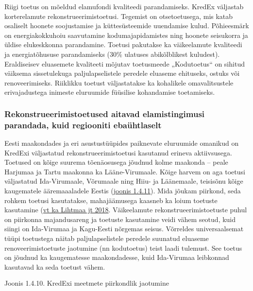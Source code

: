 \documentclass[estonian,]{article}
\begin{document}
Riigi toetus on mõeldud elamufondi kvaliteedi parandamiseks. KredEx väljastab korterelamute rekonstrueerimistoetusi. Tegemist on otsetoetusega, mis katab osaliselt hoonete soojustamise ja küttesüsteemide uuendamise kulud. Põhieesmärk on energiakokkuhoiu saavutamine kodumajapidamistes ning hoonete seisukorra ja üldise elukeskkonna parandamine. Toetusi pakutakse ka väikeelamute kvaliteedi ja energiatõhususe parandamiseks (30\% ulatuses abikõlblikest kuludest). Eraldiseisev eluasemete kvaliteeti mõjutav toetusmeede „Kodutoetus`` on sihitud väiksema sissetulekuga paljulapselistele peredele eluaseme ehituseks, ostuks või renoveerimiseks. Riiklikku toetust väljastatakse ka kohalikele omavalitsustele erivajadustega inimeste eluruumide füüsilise kohandamise toetamiseks.

\hypertarget{rekonstrueerimistoetused-aitavad-elamistingimusi-parandada-kuid-regiooniti-ebauxfchtlaselt}{%
\subsubsection*{Rekonstrueerimistoetused aitavad elamistingimusi parandada, kuid regiooniti ebaühtlaselt}\label{rekonstrueerimistoetused-aitavad-elamistingimusi-parandada-kuid-regiooniti-ebauxfchtlaselt}}

Eesti maakondades ja eri asustustüüpides paiknevate eluruumide omanikud on KredExi väljastatud rekonstrueerimistoetusi kasutanud erineva aktiivsusega. Toetused on kõige suurema tõenäosusega jõudnud kolme maakonda -- peale Harjumaa ja Tartu maakonna ka Lääne-Virumaale. Kõige harvem on aga toetusi väljastatud Ida-Virumaale, Võrumaale ning Hiiu- ja Läänemaale, teisisõnu kõige kaugematele ääremaaaladele Eestis (\protect\hyperlink{figure1411}{joonis 1.4.11}). Mida jõukam piirkond, seda rohkem toetusi kasutatakse, mahajäämusega kaasneb ka loium toetuste kasutamine (\protect\hyperlink{Lihtmaa2018}{vt ka Lihtmaa jt 2018}. Väikeelamute rekonstrueerimistoetuste puhul on piirkonna majandusareng ja toetuste kasutamine veidi vähem seotud, kuid siingi on Ida-Virumaa ja Kagu-Eesti nõrgemas seisus. Võrreldes universaalsemat tüüpi toetustega näitab paljulapselistele peredele suunatud eluaseme renoveerimistoetuste jaotumine (nn kodutoetus) teist laadi tulemust. See toetus on jõudnud ka kaugematesse maakondadesse, kuid Ida-Virumaa leibkonnad kasutavad ka seda toetust vähem.

{Joonis 1.4.10.} KredExi meetmete piirkondlik jaotumine
\end{document}
